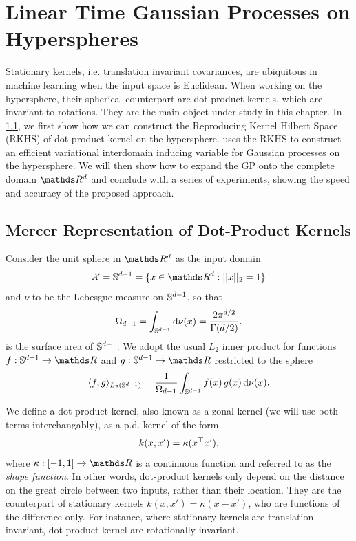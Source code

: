 \ifpdf
    \graphicspath{{Chapter3/Figs/Vector/}{Chapter3/Figs/PDF/}{Chapter3/Figs/}}
\else
    \graphicspath{{Chapter3/Figs/Raster/}{Chapter3/Figs/}}
\fi


\chapter{Linear Time Gaussian Processes on Hyperspheres}
\label{chapter:vish}

Stationary kernels, i.e. translation invariant covariances, are ubiquitous in machine learning when the input space is Euclidean. When working on the hypersphere, their spherical counterpart are dot-product kernels, which are invariant to rotations. They are the main object under study in this chapter. In \cref{sec:rkhs-dotproduct-kernels}, we first show how we can construct the Reproducing Kernel Hilbert Space (RKHS) of dot-product kernel on the hypersphere.  uses the RKHS to construct an efficient variational interdomain inducing variable for Gaussian processes on the hypersphere. We will then show how to expand the GP onto the complete domain $\Reals^d$ and conclude with a series of experiments, showing the speed and accuracy of the proposed approach.

\section{Mercer Representation of Dot-Product Kernels}
\label{sec:rkhs-dotproduct-kernels}

Consider the unit sphere in $\Reals^d$  as the input domain
\begin{equation}
    \mathcal{X} = \dsphere = \{x \in \Reals^d: \norm{x}_2 = 1\}
\end{equation}
and $\nu$ to be the Lebesgue measure on $\mathbb{S}^{d-1}$, so that
\begin{equation}
    \Omega_{d-1} = \int_{\mathbb{S}^{d-1}} \mathrm{d}{\nu(x)} = \frac{2 \pi ^ {d/2}}{\Gamma(d/2)}.
\end{equation}
is the surface area of $\mathbb{S}^{d-1}$. We adopt the usual $L_2$ inner product for functions $f: \dsphere \rightarrow \Reals$ and $g: \dsphere \rightarrow \Reals$ restricted to the sphere 
\begin{equation}
     \langle f, g\rangle_{L_{2}(\mathbb{S}^{d-1})} = \frac{1}{\Omega_{d-1}} \int_{\mathbb{S}^{d-1}} f(x)\,g(x) \, \mathrm{d}{\nu(x)}.
\end{equation}

We define a dot-product kernel, also known as a zonal kernel (we will use both terms interchangably), as a p.d. kernel of the form
\begin{equation}
    k(x, x') = \kappa(x^{\top} x'),
\end{equation}
where $\kappa: [-1, 1] \rightarrow \Reals$ is a continuous function and referred to as the \emph{shape function}. In other words, dot-product kernels only depend on the distance on the great circle between two inputs, rather than their location. They are the counterpart of stationary kernels $k(x, x') = \kappa(x - x')$, who are functions of the difference only. For instance, where stationary kernels are translation invariant, dot-product kernel are rotationally invariant.

